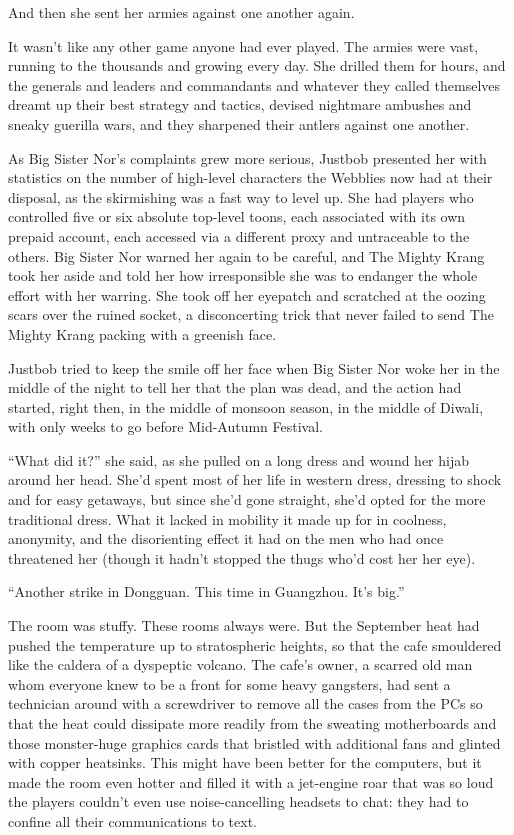 And then she sent her armies against one another again.

It wasn't like any other game anyone had ever played. The armies
were vast, running to the thousands and growing every day. She
drilled them for hours, and the generals and leaders and
commandants and whatever they called themselves dreamt up their
best strategy and tactics, devised nightmare ambushes and sneaky
guerilla wars, and they sharpened their antlers against one
another.

As Big Sister Nor's complaints grew more serious, Justbob presented
her with statistics on the number of high-level characters the
Webblies now had at their disposal, as the skirmishing was a fast
way to level up. She had players who controlled five or six
absolute top-level toons, each associated with its own prepaid
account, each accessed via a different proxy and untraceable to the
others. Big Sister Nor warned her again to be careful, and The
Mighty Krang took her aside and told her how irresponsible she was
to endanger the whole effort with her warring. She took off her
eyepatch and scratched at the oozing scars over the ruined socket,
a disconcerting trick that never failed to send The Mighty Krang
packing with a greenish face.

Justbob tried to keep the smile off her face when Big Sister Nor
woke her in the middle of the night to tell her that the plan was
dead, and the action had started, right then, in the middle of
monsoon season, in the middle of Diwali, with only weeks to go
before Mid-Autumn Festival.

``What did it?'' she said, as she pulled on a long dress and wound
her hijab around her head. She'd spent most of her life in western
dress, dressing to shock and for easy getaways, but since she'd
gone straight, she'd opted for the more traditional dress. What it
lacked in mobility it made up for in coolness, anonymity, and the
disorienting effect it had on the men who had once threatened her
(though it hadn't stopped the thugs who'd cost her her eye).

``Another strike in Dongguan. This time in Guangzhou. It's big.''

\tb

The room was stuffy. These rooms always were. But the September
heat had pushed the temperature up to stratospheric heights, so
that the cafe smouldered like the caldera of a dyspeptic volcano.
The cafe's owner, a scarred old man whom everyone knew to be a
front for some heavy gangsters, had sent a technician around with a
screwdriver to remove all the cases from the PCs so that the heat
could dissipate more readily from the sweating motherboards and
those monster-huge graphics cards that bristled with additional
fans and glinted with copper heatsinks. This might have been better
for the computers, but it made the room even hotter and filled it
with a jet-engine roar that was so loud the players couldn't even
use noise-cancelling headsets to chat: they had to confine all
their communications to text.

